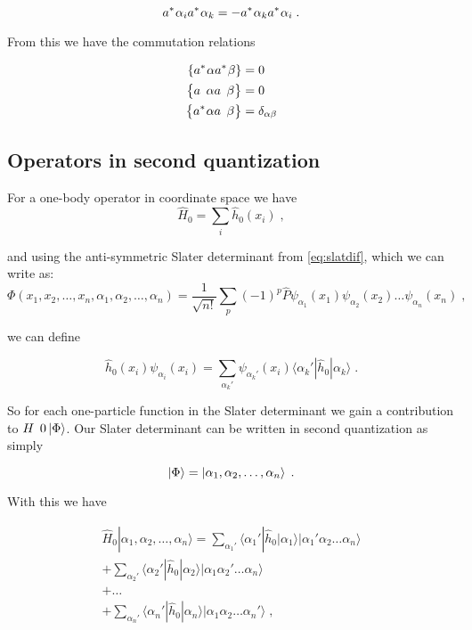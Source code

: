 $$\hc{a}{\alpha_i}\hc{a}{\alpha_k} = - \hc{a}{\alpha_k}\hc{a}{\alpha_i} \;.$$

From this we have the commutation relations

\begin{align}
    \left \{ \hc{a}{\alpha}\hc{a}{\beta} \right \} &= 0 \\
    \left \{ \op{a}{\alpha}\op{a}{\beta} \right \} &= 0 \\ 
    \left \{ \hc{a}{\alpha}\op{a}{\beta} \right \} &= \delta_{\alpha\beta}
\end{align}

\subsection{Operators in second quantization}
For a one-body operator in coordinate space we have
\begin{equation}
    \hat{H}_0 = \sum_i \hat{h}_0(x_i) \label{eq:2-23} \; ,
\end{equation}

and using the anti-symmetric Slater determinant from \ref{eq:slatdif}, which we can write as:
\begin{equation}
    \Phi(x_1, x_2,\dots ,x_n,\alpha_1,\alpha_2,\dots, \alpha_n)= \frac{1}{\sqrt{n!}} \sum_p (-1)^p\hat{P}\psi_{\alpha_1}(x_1)\psi_{\alpha_2}(x_2) \dots \psi_{\alpha_n}(x_n) \; ,
\end{equation}

we can define 

\begin{equation}
    \hat{h}_0(x_i) \psi_{\alpha_i}(x_i) = \sum_{\alpha_k'} \psi_{\alpha_k'}(x_i) \langle\alpha_k'|\hat{h}_0|\alpha_k\rangle \label{eq:2-25} \; .
\end{equation}

So for each one-particle function in the Slater determinant we gain a contribution to $\op{H}{0}\ket{\Phi}$. Our Slater determinant can be written in second quantization as simply

\begin{equation}
    \ket{\Phi} = \ket{\alpha_1, \alpha_2, \dots, \alpha_n} \; .
\end{equation}

With this we have

\begin{gather}
    \hat{H}_0|\alpha_1,\alpha_2,\dots, \alpha_n\rangle = \sum_{\alpha_1'}\langle \alpha_1'|\hat{h}_0|\alpha_1\rangle
    	|\alpha_1'\alpha_2 \dots \alpha_{n}\rangle \nonumber \\
     + \sum_{\alpha_2'} \langle \alpha_2'|\hat{h}_0|\alpha_2\rangle
    	|\alpha_1\alpha_2' \dots \alpha_{n}\rangle \nonumber \\
     + \dots \\
    + \sum_{\alpha_n'} \langle \alpha_n'|\hat{h}_0|\alpha_n\rangle
    	|\alpha_1\alpha_2 \dots \alpha_{n}'\rangle \label{eq:2-28} \; ,
\end{gather}

